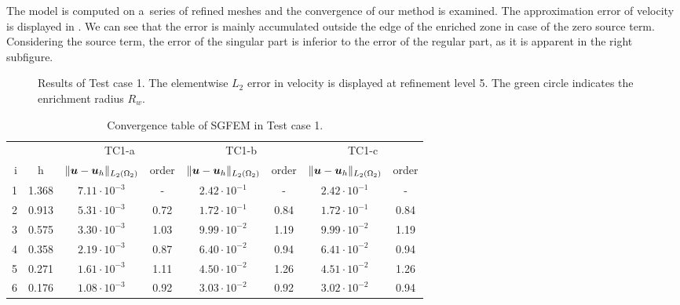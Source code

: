The model is computed on a~series of refined meshes and the convergence of our method is examined.
The approximation error of velocity is displayed in . We can see that 
the error is mainly accumulated outside the edge of the enriched zone in case of the zero source term.
Considering the source term, the error of the singular part is inferior to the error of the regular part, as it is apparent
in the right subfigure.
%
\begin{figure}[!htb]
    \centering
    \caption[Error distribution in Test case 1.]
    {Results of Test case 1. The elementwise $L_2$ error in velocity is displayed at refinement level 5.
    The green circle indicates the enrichment radius $R_w$.}
    \label{fig:mh_tc1_error}
\end{figure}
%
%
%
\begin{table}[!htb]
\begin{center}
\bgroup
\def\arraystretch{1.2}
\setlength\tabcolsep{5pt}
\begin{tabular}{rc|cc|cc|cc}
\toprule
\multicolumn{2}{c|}{} & \multicolumn{2}{c|}{ TC1-a} & \multicolumn{2}{c|}{TC1-b} & \multicolumn{2}{c}{TC1-c}\\ [3pt] %
i & h & $\|\mathbf{\boldsymbol{u}}-\mathbf{\boldsymbol{u}}_h\|_{L_2(\Omega_2)}$ & order & $\|\mathbf{\boldsymbol{u}}-\mathbf{\boldsymbol{u}}_h\|_{L_2(\Omega_2)}$
    & order & $\|\mathbf{\boldsymbol{u}}-\mathbf{\boldsymbol{u}}_h\|_{L_2(\Omega_2)}$ & order \\ [3pt] \midrule
1 & 1.368 &  $7.11\cdot10^{-3}$  &  -   &  $2.42\cdot10^{-1}$  &  -   &  $2.42\cdot10^{-1}$ &   -   \\
2 & 0.913 &  $5.31\cdot10^{-3}$  & 0.72 &  $1.72\cdot10^{-1}$  & 0.84 &  $1.72\cdot10^{-1}$ &  0.84 \\
3 & 0.575 &  $3.30\cdot10^{-3}$  & 1.03 &  $9.99\cdot10^{-2}$  & 1.19 &  $9.99\cdot10^{-2}$ &  1.19 \\
4 & 0.358 &  $2.19\cdot10^{-3}$  & 0.87 &  $6.40\cdot10^{-2}$  & 0.94 &  $6.41\cdot10^{-2}$ &  0.94 \\
5 & 0.271 &  $1.61\cdot10^{-3}$  & 1.11 &  $4.50\cdot10^{-2}$  & 1.26 &  $4.51\cdot10^{-2}$ &  1.26 \\
6 & 0.176 &  $1.08\cdot10^{-3}$  & 0.92 &  $3.03\cdot10^{-2}$  & 0.92 &  $3.02\cdot10^{-2}$ &  0.94 \\
\bottomrule
\end{tabular}
\caption{Convergence table of SGFEM in Test case 1.}
\label{tab:mh_tc1_convergence}
\egroup
\end{center}
\end{table}

